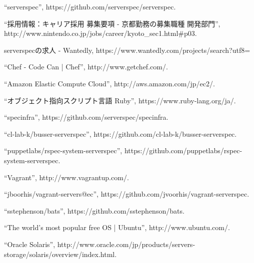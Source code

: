 \begin{thebibliography}{99}
``serverspec'', https://github.com/serverspec/serverspec.

``採用情報：キャリア採用 募集要項 - 京都勤務の募集職種 開発部門'',
http://www.nintendo.co.jp/jobs/career/kyoto\_sec1.html\#p03.

serverspecの求人 - Wantedly,
https://www.wantedly.com/projects/search?utf8=%

``Chef - Code Can | Chef'', http://www.getchef.com/.

``Amazon Elastic Compute Cloud'',
http://aws.amazon.com/jp/ec2/.

``オブジェクト指向スクリプト言語 Ruby'',
https://www.ruby-lang.org/ja/.

``specinfra'', https://github.com/serverspec/specinfra.

``cl-lab-k/busser-serverspec'',
https://github.com/cl-lab-k/busser-serverspec.

``puppetlabs/rspec-system-serverspec'',
https://github.com/puppetlabs/rspec-system-serverspec.

``Vagrant'',
http://www.vagrantup.com/.

``jboorhis/vagrant-servers@ec'',
https://github.com/jvoorhis/vagrant-serverspec.

``sstephenson/bats'',
https://github.com/sstephenson/bats.

``The world's most popular free OS | Ubuntu'',
http://www.ubuntu.com/.

``Oracle Solaris'',
http://www.oracle.com/jp/products/servers-storage/solaris/overview/index.html.

\end{thebibliography}
